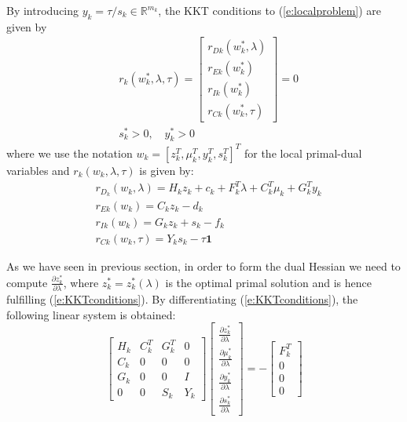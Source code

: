 By introducing $y_k = \tau/s_k \in \mathbb{R}^{m_k}$, the KKT conditions to (\ref{e:localproblem}) are given by
\begin{subequations}
\label{e:KKTconditions}
\begin{align}
& r_k(w_k^*, \lambda, \tau) = \left[ \begin{array}{c}
r_{Dk}(w_k^*, \lambda) \\
r_{Ek}(w_k^*) \\
r_{Ik}(w_k^*) \\
r_{Ck}(w_k^*, \tau)
\end{array} \right] = 0 \\
& s_k^* > 0, \quad y_k^* > 0
\end{align}
\end{subequations}
where we use the notation $w_k = [z_k^T, \mu_k^T, y_k^T, s_k^T ]^T$ for the local primal-dual variables and $r_k(w_k, \lambda, \tau)$ is given by:
\begin{subequations}
\begin{align}
& r_{D_k}(w_k, \lambda) = H_k z_k + c_k + F_k^T \lambda + C_k^T \mu_k + G_k^T y_k \\
& r_{Ek}(w_k) = C_k z_k - d_k \\
& r_{Ik}(w_k) = G_k z_k + s_k - f_k \\
& r_{Ck}(w_k, \tau) = Y_k s_k - \tau \mathbf{1} 
\end{align}
\end{subequations}

As we have seen in previous section, in order to form the dual Hessian we need to compute $\frac{\partial z_k^*}{\partial \lambda}$, where $z_k^* = z_k^*(\lambda)$ is the optimal primal solution and is hence fulfilling (\ref{e:KKTconditions}). By differentiating (\ref{e:KKTconditions}), the following linear system is obtained:
\begin{equation}
\label{e:SensitivityLambda}
\left[ \begin{array}{cccc}
H_k & C_k^T & G_k^T & 0 \\
C_k & 0 & 0 & 0 \\
G_k & 0 & 0 & I \\
0 & 0 & S_k & Y_k
\end{array} \right]
\left[ \begin{array}{c}
\frac{\partial z_k^*}{\partial \lambda} \\
\frac{\partial \mu_k^*}{\partial \lambda} \\
\frac{\partial y_k^*}{\partial \lambda} \\
\frac{\partial s_k^*}{\partial \lambda}
\end{array} \right] = -
\left[ \begin{array}{c}
F_k^T \\
0 \\
0 \\
0
\end{array} \right]
\end{equation}

